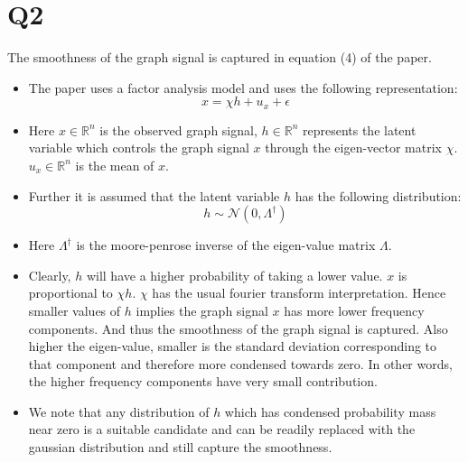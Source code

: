 \documentclass{article}
\begin{document}
\section*{Q2}
The smoothness of the graph signal is captured in equation (4) of the paper.
\begin{itemize}
\item The paper uses a factor analysis model and uses the following representation:
  $$ x = \chi h + u_x + \epsilon$$
\item Here $x \in \mathbb{R}^n$ is the observed graph signal, $h \in \mathbb{R}^n$ represents the latent variable which controls the graph signal $x$ through the eigen-vector matrix $\chi$. $u_x \in \mathbb{R}^n$ is the mean of $x$.
\item Further it is assumed that the latent variable $h$ has the following distribution:
  $$h \sim \mathcal{N}(0, \Lambda^{\dagger})$$
\item Here $\Lambda^{\dagger}$ is the moore-penrose inverse of the eigen-value matrix $\Lambda$.
\item Clearly, $h$ will have a higher probability of taking a lower value. $x$ is proportional to $\chi h$. $\chi$ has the usual fourier transform interpretation. Hence smaller values of $h$ implies the graph signal $x$ has more lower frequency components. And thus the smoothness of the graph signal is captured. Also higher the eigen-value, smaller is the standard deviation corresponding to that component and therefore more condensed towards zero. In other words, the higher frequency components have very small contribution.
\item We note that any distribution of $h$ which has condensed probability mass near zero is a suitable candidate and can be readily replaced with the gaussian distribution and still capture the smoothness.
\end{itemize}
\end{document}
